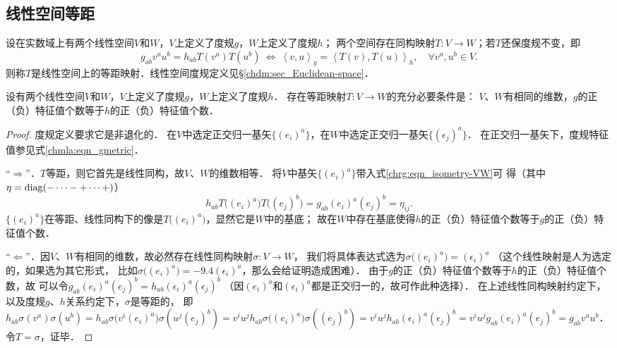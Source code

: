 
\subsection{线性空间等距}

\begin{definition}\label{chrg:def_isometry-VW}
设在实数域上有两个线性空间$V$和$W$，$V$上定义了度规$g$，$W$上定义了度规$h$；
两个空间存在同构映射$T:V\to W$；若$T$还保度规不变，即
\begin{equation}\label{chrg:eqn_isometry-VW}
    g_{ab}v^a u^b = h_{ab} T(v^a) T(u^b)    \ \Leftrightarrow \ 
    \left<v,u\right>_g = \left<T(v),T(u)\right>_h,
    \quad    \forall v^a, u^b \in V.
\end{equation}
则称$T$是线性空间上的{\heiti 等距映射}．线性空间度规定义见\S\ref{chdm:sec_Euclidean-space}．
\end{definition}

\begin{proposition}\label{chrg:thm_isometry-VW}
设有两个线性空间$V$和$W$，$V$上定义了度规$g$，$W$上定义了度规$h$．
存在等距映射$T:V\to W$的充分必要条件是：
$V$、$W$有相同的维数，$g$的正（负）特征值个数等于$h$的正（负）特征值个数．    
\end{proposition}
\begin{proof}
        度规定义要求它是非退化的．
    在$V$中选定正交归一基矢$\{(e_i)^a\}$，在$W$中选定正交归一基矢$\{(\epsilon_j)^a\}$．
    在正交归一基矢下，度规特征值参见式\eqref{chmla:eqn_gmetric}．
    
    “$\Rightarrow$”．$T$等距，则它首先是线性同构，故$V$、$W$的维数相等．
    将$V$中基矢$\{(e_i)^a\}$带入式\eqref{chrg:eqn_isometry-VW}可
    得（其中$\eta={\rm diag}(-\cdots -+\cdots +)$）
    \begin{equation}
         h_{ab} T\bigl((e_i)^a\bigr) T\bigl((e_j)^b\bigr) = g_{ab} (e_i)^a(e_j)^b = \eta_{ij} .
    \end{equation}
    $\{(e_i)^a\}$在等距、线性同构下的像是$T\bigl((e_i)^a\bigr)$，显然它是$W$中的基底；
    故在$W$中存在基底使得$h$的正（负）特征值个数等于$g$的正（负）特征值个数．  
    
    “$\Leftarrow$”．因$V$、$W$有相同的维数，故必然存在线性同构映射$\sigma:V\to W$，
    我们将具体表达式选为$\sigma\bigl((e_i)^a\bigr) = (\epsilon_i)^a$
    （这个线性映射是人为选定的，如果选为其它形式，
    比如$\sigma\bigl((e_i)^a\bigr) =-9.4 (\epsilon_i)^a$，那么会给证明造成困难）．
    由于$g$的正（负）特征值个数等于$h$的正（负）特征值个数，故
    可以令$g_{ab}(e_i)^a(e_j)^b = h_{ab}(\epsilon_i)^a(\epsilon_j)^b$
    （因$(e_i)^a$和$(\epsilon_i)^a$都是正交归一的，故可作此种选择）．
    在上述线性同构映射约定下，以及度规$g$、$h$关系约定下，$\sigma$是等距的，
    即$h_{ab} \sigma(v^a) \sigma(u^b)=h_{ab} \sigma\bigl(v^i(e_i)^a\bigr) \sigma(u^j(e_j)^b)
    =v^i u^j h_{ab} \sigma\bigl((e_i)^a\bigr) \sigma((e_j)^b) 
    =v^i u^j h_{ab} (\epsilon_i)^a (\epsilon_j)^b 
    =v^i u^j g_{ab} (e_i)^a (e_j)^b  = g_{ab}v^a u^b$．
    令$T=\sigma$，证毕．
\end{proof}



